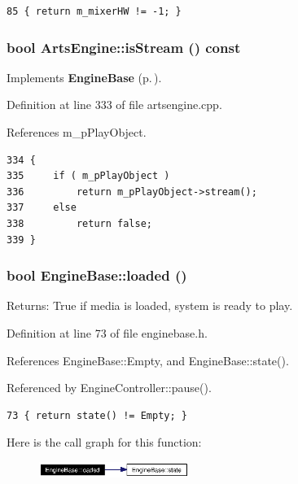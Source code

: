 \footnotesize\begin{verbatim}85 { return m_mixerHW != -1; }
\end{verbatim}\normalsize 
{}
\subsubsection{\setlength{\rightskip}{0pt plus 5cm}bool Arts\-Engine::is\-Stream () const\hspace{0.3cm}{\tt  [virtual]}}\label{classArtsEngine_ArtsEnginea8}




Implements {\bf Engine\-Base} {\rm (p.\,\pageref{classEngineBase_EngineBasea12})}.

Definition at line 333 of file artsengine.cpp.

References m\_\-p\-Play\-Object.



\footnotesize\begin{verbatim}334 {
335     if ( m_pPlayObject )
336         return m_pPlayObject->stream();
337     else
338         return false;
339 }
\end{verbatim}\normalsize 
{}
\subsubsection{\setlength{\rightskip}{0pt plus 5cm}bool Engine\-Base::loaded ()\hspace{0.3cm}{\tt  [inline, inherited]}}\label{classEngineBase_EngineBasea9}


\begin{Desc}
\item[Returns:]True if media is loaded, system is ready to play. \end{Desc}


Definition at line 73 of file enginebase.h.

References Engine\-Base::Empty, and Engine\-Base::state().

Referenced by Engine\-Controller::pause().



\footnotesize\begin{verbatim}73 { return state() != Empty; }
\end{verbatim}\normalsize 


Here is the call graph for this function:\begin{figure}[H]
\begin{center}
\leavevmode
\includegraphics[width=138pt]{classEngineBase_EngineBasea9_cgraph}
\end{center}
\end{figure}
